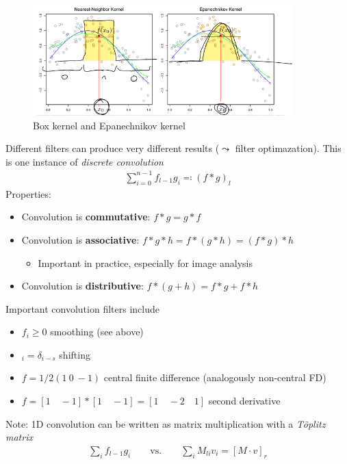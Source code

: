 \begin{figure}[htpb]
  \centering \includegraphics[width=0.9\textwidth,trim={0 1mm 0
    0},clip]{Figures/convolution_weight_examples.png}
  \caption{Box kernel and Epanechnikov kernel}%
  \label{fig:conv:kernel}
\end{figure}

Different filters can produce very different results ($\leadsto$
filter optimazation). This is one instance of \emph{discrete
  convolution}
\begin{gather*}
  \sum_{i=0}^{n-1}f_{l-1}g_i \eqqcolon (f \ast g)_l
\end{gather*}
Properties:
\begin{itemize}
\item Convolution is \textbf{commutative}: $f \ast g = g \ast f$
\item Convolution is \textbf{associative}:
  $f \ast g \ast h = f \ast (g \ast h) = (f \ast g) \ast h$
  \begin{itemize}
  \item Important in practice, especially for image analysis
  \end{itemize}
\item Convolution is \textbf{distributive}:
  $f \ast (g + h) = f \ast g + f \ast h$
\end{itemize}
Important convolution filters include
\begin{itemize}
\item $f_i \ge 0$ smoothing (see above)
\item $_i = \delta_{i-s}$ shifting
\item $f = 1/2(1 \ 0 \ -1)$ central finite difference (analogously
  non-central FD)
\item $f = [1\quad -1] \ast [1\quad -1] = [1\quad -2\quad 1]$ second
  derivative
\end{itemize}
Note: 1D convolution can be written as matrix multiplication with a
\emph{Töplitz matrix}
\begin{gather*}
  \sum_i f_{l-1}g_i \qquad \text{vs.} \qquad \sum_i M_{li}v_i =
  [M\cdot v]_r
\end{gather*}
